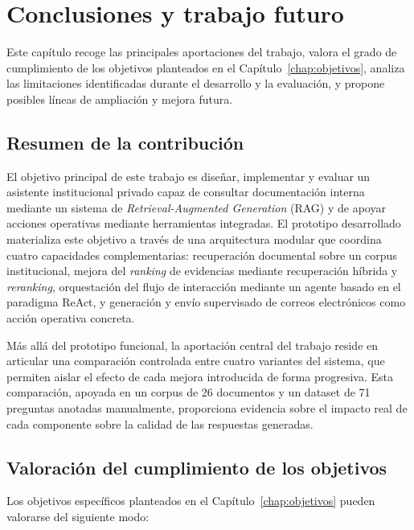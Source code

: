 \chapter{Conclusiones y trabajo futuro}\label{chap:conclusiones}

Este capítulo recoge las principales aportaciones del trabajo, valora el grado de cumplimiento de los objetivos planteados en el Capítulo~\ref{chap:objetivos}, analiza las limitaciones identificadas durante el desarrollo y la evaluación, y propone posibles líneas de ampliación y mejora futura.

\section{Resumen de la contribución}\label{sec:resumen-contribucion}

El objetivo principal de este trabajo es diseñar, implementar y evaluar un asistente institucional privado capaz de consultar documentación interna mediante un sistema de \textit{Retrieval-Augmented Generation} (RAG) y de apoyar acciones operativas mediante herramientas integradas. 
El prototipo desarrollado materializa este objetivo a través de una arquitectura modular que coordina cuatro capacidades complementarias: recuperación documental sobre un corpus institucional, mejora del \textit{ranking} de evidencias mediante recuperación híbrida y \textit{reranking}, orquestación del flujo de interacción mediante un agente basado en el paradigma ReAct, y generación y envío supervisado de correos electrónicos como acción operativa concreta.

Más allá del prototipo funcional, la aportación central del trabajo reside en articular una comparación controlada entre cuatro variantes del sistema, que permiten aislar el efecto de cada mejora introducida de forma progresiva. 
Esta comparación, apoyada en un corpus de 26 documentos y un dataset de 71 preguntas anotadas manualmente, proporciona evidencia sobre el impacto real de cada componente sobre la calidad de las respuestas generadas.

\section{Valoración del cumplimiento de los objetivos}\label{sec:cumplimiento-objetivos}

Los objetivos específicos planteados en el Capítulo~\ref{chap:objetivos} pueden valorarse del siguiente modo:

